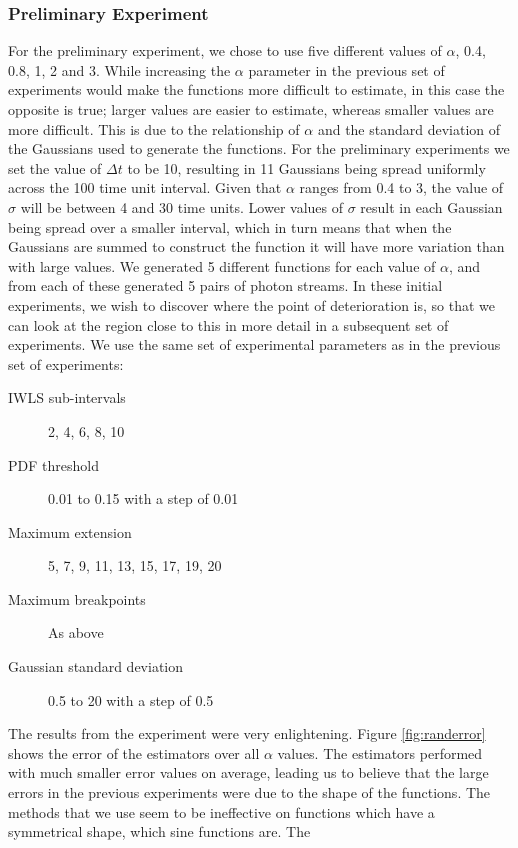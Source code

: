 \documentclass[a4paper,11pt]{article}
\begin{document}
\subsubsection{Preliminary Experiment}
\label{sec-8-2-1}

For the preliminary experiment, we chose to use five different values of
$\alpha$, 0.4, 0.8, 1, 2 and 3. While increasing the $\alpha$ parameter in the
previous set of experiments would make the functions more difficult to estimate,
in this case the opposite is true; larger values are easier to estimate, whereas
smaller values are more difficult. This is due to the relationship of $\alpha$
and the standard deviation of the Gaussians used to generate the functions. For
the preliminary experiments we set the value of $\Delta t$ to be 10, resulting
in 11 Gaussians being spread uniformly across the 100 time unit interval. Given
that $\alpha$ ranges from 0.4 to 3, the value of $\sigma$ will be between 4 and
30 time units. Lower values of $\sigma$ result in each Gaussian being spread
over a smaller interval, which in turn means that when the Gaussians are summed
to construct the function it will have more variation than with large values. We
generated 5 different functions for each value of $\alpha$, and from each of
these generated 5 pairs of photon streams. In these initial experiments, we wish
to discover where the point of deterioration is, so that we can look at the
region close to this in more detail in a subsequent set of experiments. We use
the same set of experimental parameters as in the previous set of experiments:
\begin{description}
\item[IWLS sub-intervals] 2, 4, 6, 8, 10
\item[PDF threshold] 0.01 to 0.15 with a step of 0.01
\item[Maximum extension] 5, 7, 9, 11, 13, 15, 17, 19, 20
\item[Maximum breakpoints] As above
\item[Gaussian standard deviation] 0.5 to 20 with a step of 0.5
\end{description}
The results from the experiment were very enlightening. Figure
\ref{fig:randerror} shows the error of the estimators over all $\alpha$
values. The estimators performed with much smaller error values on average,
leading us to believe that the large errors in the previous experiments were due
to the shape of the functions. The methods that we use seem to be ineffective on
functions which have a symmetrical shape, which sine functions are. The
\end{document}
